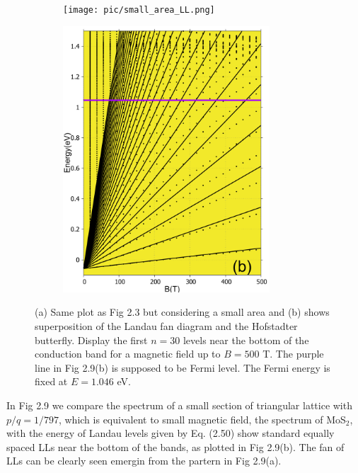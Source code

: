 \documentclass{report}
\begin{document}
\begin{figure}[htb]
	\centering
	\begin{subfigure}[b]{0.49\textwidth}
		\centering
		{\texttt{[image: pic/small\_area\_LL.png]}}
	\end{subfigure}
	\begin{subfigure}[b]{0.49\textwidth}
		\centering
		\includegraphics[width=0.85\textwidth,height=1.2\linewidth]{pic/landaulevel_h0_q_797_EF_final.pdf}
	\end{subfigure}
	\caption{
		(a) Same plot as Fig 2.3 but considering a small area and (b) shows superposition of the Landau fan diagram and the Hofstadter butterfly. Display the first $n = 30$ levels near the bottom of the conduction band for a magnetic field up to $B = 500$ T. The purple line in Fig 2.9(b) is supposed to be Fermi level. The Fermi energy is fixed at $E = 1.046$ eV.
	}
\end{figure}

In Fig 2.9 we compare the spectrum of a small section of triangular lattice with $p / q = 1 / 797$, which is equivalent to small magnetic field, the spectrum of MoS$_{2}$, with the energy of Landau levels given by Eq. (2.50) show standard equally spaced LLs \cite{Shoenberg_1984,singleton2001band,blundell2001magnetism,kittel1987quantum} near the bottom of the bands, as plotted in Fig 2.9(b). The fan of LLs can be clearly seen emergin from the partern in Fig 2.9(a).
\end{document}
